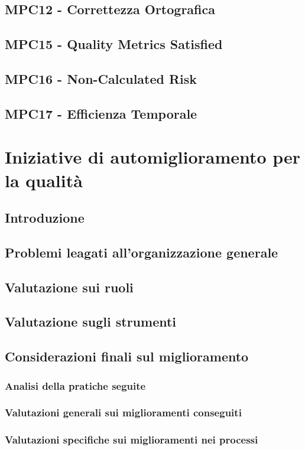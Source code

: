 \documentclass[italian,12pt]{article} %
\begin{document}
\subsection{MPC12 - Correttezza Ortografica}

\subsection{MPC15 - Quality Metrics Satisfied}

\subsection{MPC16 - Non-Calculated Risk}

\subsection{MPC17 - Efficienza Temporale}

\section{Iniziative di automiglioramento per la qualità}

\subsection{Introduzione}

\subsection{Problemi leagati all’organizzazione generale}

\subsection{Valutazione sui ruoli}

\subsection*{Valutazione sugli strumenti}

\subsection{Considerazioni finali sul miglioramento}

\subsubsection{Analisi della pratiche seguite}

\subsubsection{Valutazioni generali sui miglioramenti conseguiti}

\subsubsection{Valutazioni specifiche sui miglioramenti nei processi}


\end{document}
